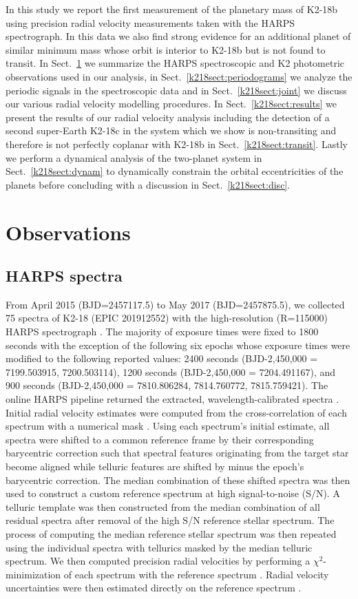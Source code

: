 In this study we report the first measurement of the planetary mass of K2-18b using precision
radial velocity measurements taken with the HARPS spectrograph. In this data we also find strong
evidence for an additional planet of similar minimum mass whose orbit is interior to K2-18b but is not found
to transit. In Sect.~\ref{k218sect:obs} we summarize the HARPS spectroscopic and K2 photometric
observations used in our analysis,
in Sect.~\ref{k218sect:periodograms} we analyze the periodic signals in the spectroscopic data
and in Sect.~\ref{k218sect:joint} we discuss our various radial velocity modelling procedures.
In Sect.~\ref{k218sect:results} 
we present the results of our radial velocity analysis including the detection of a second 
super-Earth K2-18c in the system which we show is non-transiting and therefore is not perfectly
coplanar with K2-18b in Sect.~\ref{k218sect:transit}.
Lastly we perform a dynamical analysis of the two-planet system in Sect.~\ref{k218sect:dynam} to
dynamically constrain the orbital eccentricities of the planets  
before concluding with a discussion in Sect.~\ref{k218sect:disc}.

\section{Observations} \label{k218sect:obs}
\subsection{HARPS spectra}
From April 2015 (BJD=2457117.5) to May 2017 (BJD=2457875.5),
we collected 75 spectra of K2-18 (EPIC 201912552) with the high-resolution (R=115000)
HARPS spectrograph \citep{mayor03,pepe04}. The majority of exposure
times were fixed to 1800 seconds with the exception of the following six epochs
whose exposure times were modified to the following reported values: 2400 seconds
(BJD-2,450,000 = 7199.503915, 7200.503114), 1200 seconds (BJD-2,450,000 = 7204.491167),
and 900 seconds (BJD-2,450,000 = 7810.806284, 7814.760772, 7815.759421). 
The online HARPS pipeline returned the extracted, wavelength-calibrated
spectra \citep{lovis07}. Initial radial velocity estimates were computed
from the cross-correlation of each spectrum with 
a numerical mask \citep{baranne96, pepe02}.
Using each spectrum's initial estimate, all spectra were shifted to
a common reference frame by their corresponding barycentric correction such
that spectral features originating from the target star become aligned while
telluric features are shifted by minus the epoch's barycentric correction.
The median combination of these shifted spectra was then used to construct
a custom reference spectrum at high signal-to-noise (S/N). A telluric template was
then constructed from the median combination of all residual spectra after
removal of the high S/N reference stellar spectrum. The process of computing the
median reference stellar spectrum was then repeated using the individual spectra
with tellurics masked by the median telluric spectrum. 
We then computed precision radial velocities by performing a $\chi^2$-minimization
of each spectrum with the reference spectrum \citep{astudillodefru15}.
Radial velocity uncertainties were then estimated directly on the reference
spectrum \citep{bouchy01}.

